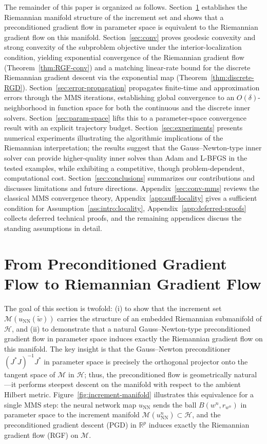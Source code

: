 \documentclass[twoside,11pt]{article}
\newcommand{\rev}[1]{#1}                           %
\newcommand{\NN}{\mathrm{NN}}
\newcommand{\calH}{\mathcal{H}}
\newcommand{\calM}{\mathcal{M}}
\begin{document}
The remainder of this paper is organized as follows. Section~\ref{sec:RGF} establishes the Riemannian manifold structure of the increment set and shows that a preconditioned gradient flow in parameter space is equivalent to the Riemannian gradient flow on this manifold. Section~\ref{sec:conv} proves geodesic convexity and strong convexity of the subproblem objective under the interior-localization condition, yielding exponential convergence of the Riemannian gradient flow (Theorem~\ref{thm:RGF-conv}) and a matching linear-rate bound for the discrete Riemannian gradient descent via the exponential map (Theorem~\ref{thm:discrete-RGD}). Section~\ref{sec:error-propagation} propagates finite-time and approximation errors through the MMS iterations, establishing global convergence to an $O(\delta)$-neighborhood in function space for both the continuous and the discrete inner solvers. Section~\ref{sec:param-space} lifts this to a parameter-space convergence result with an explicit trajectory budget. Section~\ref{sec:experiments} presents numerical experiments illustrating the algorithmic implications of the Riemannian interpretation; the results suggest that the Gauss--Newton-type inner solver can provide higher-quality inner solves than Adam and L-BFGS in the tested examples, while exhibiting a competitive, though problem-dependent, computational cost. Section~\ref{sec:conclusions} summarizes our contributions and discusses limitations and future directions. Appendix~\ref{sec:conv-mms} reviews the classical MMS convergence theory, Appendix~\ref{app:suff-locality} gives a sufficient condition for Assumption~\ref{ass:intro:locality}, Appendix~\ref{app:deferred-proofs} collects deferred technical proofs, and the remaining appendices discuss the standing assumptions in detail.







\section{From Preconditioned Gradient Flow to Riemannian Gradient Flow}\label{sec:RGF}
\rev{%
The goal of this section is twofold: (i) to show that the increment set $\calM(u_{\NN}(\tilde w))$
carries the structure of an embedded Riemannian submanifold of $\calH$, and (ii) to demonstrate that
a natural Gauss--Newton-type preconditioned gradient flow in parameter space induces
exactly the Riemannian gradient flow on this manifold.
The key insight is that the Gauss--Newton preconditioner $(J^*J)^{-1}J^*$ in parameter space
is precisely the orthogonal projector onto the tangent space of $\calM$ in $\calH$; thus,
the preconditioned flow is geometrically natural---it performs steepest descent on the manifold
with respect to the ambient Hilbert metric.
Figure~\ref{fig:increment-manifold} illustrates this equivalence for a single MMS step: the neural network map $u_{\mathrm{NN}}$ sends the ball $B(w^n, r_{w^n})$ in parameter space to the increment manifold $\calM(u^n_{\mathrm{NN}})\subset\calH$, and the preconditioned gradient descent (PGD) in $\mathbb{R}^p$ induces exactly the Riemannian gradient flow (RGF) on $\calM$.
}
\end{document}
